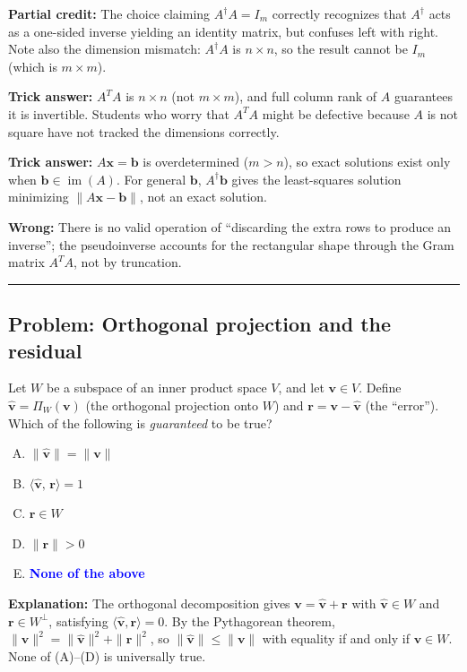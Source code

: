 \documentclass[12pt]{amsart}
\newcommand{\divider}{
  \vspace{-1em}
  \noindent
  \raisebox{-0.15ex}{\textbullet}%
  \hspace{0.5em}%
  \rule[0.5ex]{0.95\textwidth}{1.0pt}%
  \hspace{0.5em}%
  \raisebox{-0.15ex}{\textbullet}%
  \vspace{0em}
}
\begin{document}
\textbf{Partial credit:}
The choice claiming $A^\dagger A = I_m$ correctly recognizes that $A^\dagger$
acts as a one-sided inverse yielding an identity matrix, but confuses left with
right.
Note also the dimension mismatch: $A^\dagger A$ is $n\times n$, so the result
cannot be $I_m$ (which is $m\times m$).

\textbf{Trick answer:}
$A^TA$ is $n\times n$ (not $m\times m$), and full column rank of $A$ guarantees
it is invertible.
Students who worry that $A^TA$ might be defective because $A$ is not square
have not tracked the dimensions correctly.

\textbf{Trick answer:}
$A\mathbf{x} = \mathbf{b}$ is overdetermined ($m > n$), so exact solutions exist only
when $\mathbf{b}\in\operatorname{im}(A)$.
For general $\mathbf{b}$, $A^\dagger\mathbf{b}$ gives the least-squares solution
minimizing $\|A\mathbf{x}-\mathbf{b}\|$, not an exact solution.

\textbf{Wrong:}
There is no valid operation of ``discarding the extra rows to produce an
inverse''; the pseudoinverse accounts for the rectangular shape through the
Gram matrix $A^TA$, not by truncation.

\divider

\subsection*{Problem: Orthogonal projection and the residual}

Let $W$ be a subspace of an inner product space $V$, and let $\mathbf{v}\in V$.
Define $\hat{\mathbf{v}} = \Pi_W(\mathbf{v})$ (the orthogonal projection onto $W$) and
$\mathbf{r} = \mathbf{v} - \hat{\mathbf{v}}$ (the ``error'').
Which of the following is \emph{guaranteed} to be true?

\begin{enumerate}[(A)]
\item $\|\hat{\mathbf{v}}\| = \|\mathbf{v}\|$
\item $\langle \hat{\mathbf{v}},\, \mathbf{r} \rangle = 1$
\item $\mathbf{r} \in W$
\item $\|\mathbf{r}\| > 0$
\item \textcolor{blue}{\textbf{None of the above}}
\end{enumerate}

\textbf{Explanation:}
The orthogonal decomposition gives $\mathbf{v} = \hat{\mathbf{v}} + \mathbf{r}$ with
$\hat{\mathbf{v}} \in W$ and $\mathbf{r} \in W^\perp$, satisfying
$\langle\hat{\mathbf{v}},\mathbf{r}\rangle = 0$.
By the Pythagorean theorem, $\|\mathbf{v}\|^2 = \|\hat{\mathbf{v}}\|^2 + \|\mathbf{r}\|^2$,
so $\|\hat{\mathbf{v}}\| \leq \|\mathbf{v}\|$ with equality if and only if
$\mathbf{v}\in W$.
None of (A)--(D) is universally true.
\end{document}
